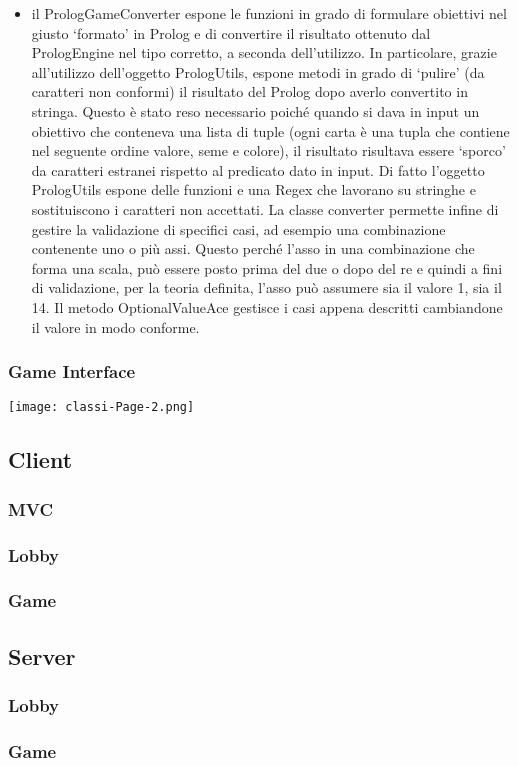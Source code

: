 \begin{itemize}
    \item il PrologGameConverter espone le funzioni in grado di formulare obiettivi nel giusto ‘formato’ in Prolog e di convertire il risultato ottenuto dal PrologEngine nel tipo corretto, a seconda dell’utilizzo.
    In particolare, grazie all’utilizzo dell’oggetto PrologUtils, espone metodi in grado di ‘pulire’ (da caratteri non conformi) il risultato del Prolog dopo averlo convertito in stringa.
    Questo è stato reso necessario poiché quando si dava in input un obiettivo che conteneva una lista di tuple (ogni carta è una tupla che contiene nel seguente ordine valore, seme e colore), il risultato risultava essere ‘sporco’ da caratteri estranei rispetto al predicato dato in input.
    Di fatto l’oggetto PrologUtils espone delle funzioni e una Regex che lavorano su stringhe e sostituiscono i caratteri non accettati.
    La classe converter permette infine di gestire la validazione di specifici casi, ad esempio una combinazione contenente uno o più assi.
    Questo perché l’asso in una combinazione che forma una scala, può essere posto prima del due o dopo del re e quindi a fini di validazione, per la teoria definita, l’asso può assumere sia il valore 1, sia il 14.
    Il metodo OptionalValueAce gestisce i casi appena descritti cambiandone il valore in modo conforme.

\end{itemize}

\subsubsection{Game Interface}
\begin{center}
    \texttt{[image: classi-Page-2.png]}
\end{center}

\subsection{Client}

\subsubsection{MVC}

\subsubsection{Lobby}

\subsubsection{Game}

\subsection{Server}

\subsubsection{Lobby}

\subsubsection{Game}

\newpage